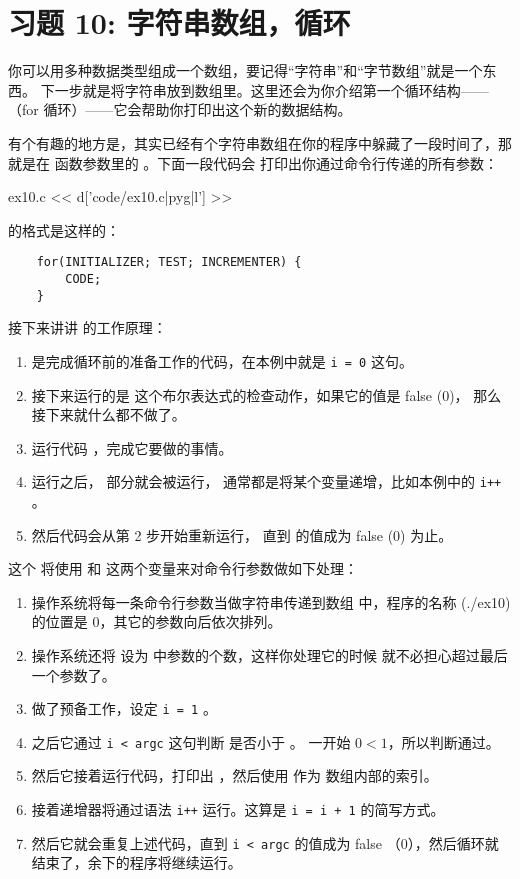 \chapter{习题 10: 字符串数组，循环}

你可以用多种数据类型组成一个数组，要记得“字符串”和“字节数组”就是一个东西。
下一步就是将字符串放到数组里。这里还会为你介绍第一个循环结构—— 
（for 循环）——它会帮助你打印出这个新的数据结构。

有个有趣的地方是，其实已经有个字符串数组在你的程序中躲藏了一段时间了，那就是在
 函数参数里的  。下面一段代码会
打印出你通过命令行传递的所有参数：

\begin{code}{ex10.c}
<< d['code/ex10.c|pyg|l'] >>
\end{code}

 的格式是这样的：

\begin{Verbatim}
    for(INITIALIZER; TEST; INCREMENTER) {
        CODE;
    }
\end{Verbatim}

接下来讲讲  的工作原理：

\begin{enumerate}
\item {} 是完成循环前的准备工作的代码，在本例中就是 \verb|i = 0| 
这句。
\item 接下来运行的是  这个布尔表达式的检查动作，如果它的值是 false (0)，
那么接下来就什么都不做了。
\item 运行代码 ，完成它要做的事情。
\item {} 运行之后， 部分就会被运行，
通常都是将某个变量递增，比如本例中的 \verb|i++| 。
\item 然后代码会从第 2 步开始重新运行， 直到  的值成为 false (0) 为止。
\end{enumerate}

这个  将使用  和  
这两个变量来对命令行参数做如下处理：

\begin{enumerate}
\item 操作系统将每一条命令行参数当做字符串传递到数组  中，程序的名称
(./ex10)的位置是 0，其它的参数向后依次排列。
\item 操作系统还将  设为  中参数的个数，这样你处理它的时候
就不必担心超过最后一个参数了。
\item {} 做了预备工作，设定 \verb|i = 1| 。
\item 之后它通过 \verb|i < argc| 这句判断  是否小于 。
一开始 $0 < 1$，所以判断通过。
\item 然后它接着运行代码，打印出  ，然后使用  作为 
 数组内部的索引。
\item 接着递增器将通过语法 \verb|i++| 运行。这算是 \verb|i = i + 1| 的简写方式。
\item 然后它就会重复上述代码，直到 \verb|i < argc| 的值成为 false （0），然后循环就结束了，余下的程序将继续运行。
\end{enumerate}

